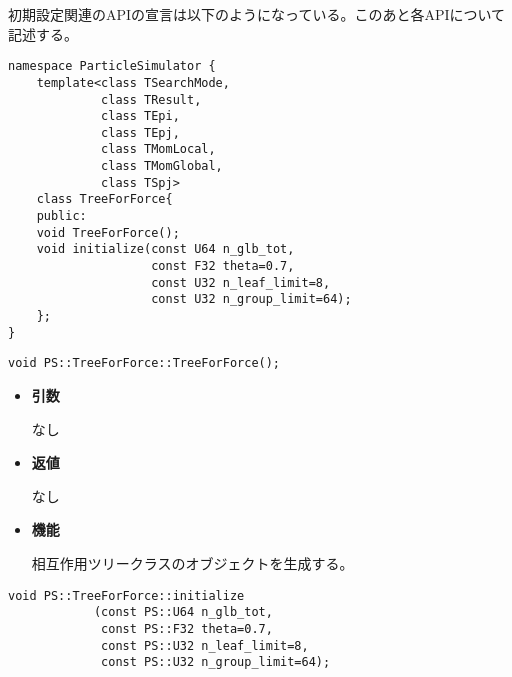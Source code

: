 初期設定関連のAPIの宣言は以下のようになっている。このあと各APIについて
記述する。
\begin{lstlisting}[caption=TreeForForce1]
namespace ParticleSimulator {
    template<class TSearchMode,
             class TResult,
             class TEpi,
             class TEpj,
             class TMomLocal,
             class TMomGlobal,
             class TSpj>
    class TreeForForce{
    public:
    void TreeForForce();
    void initialize(const U64 n_glb_tot,
                    const F32 theta=0.7,
                    const U32 n_leaf_limit=8,
                    const U32 n_group_limit=64);
    };
}
\end{lstlisting}


\begin{screen}
\begin{verbatim}
void PS::TreeForForce::TreeForForce();
\end{verbatim}
\end{screen}

\begin{itemize}

\item {\bf 引数}

なし

\item {\bf 返値}

なし

\item {\bf 機能}

相互作用ツリークラスのオブジェクトを生成する。

\end{itemize}


\begin{screen}
\begin{verbatim}
void PS::TreeForForce::initialize
            (const PS::U64 n_glb_tot,
             const PS::F32 theta=0.7,
             const PS::U32 n_leaf_limit=8,
             const PS::U32 n_group_limit=64);
\end{verbatim}
\end{screen}

